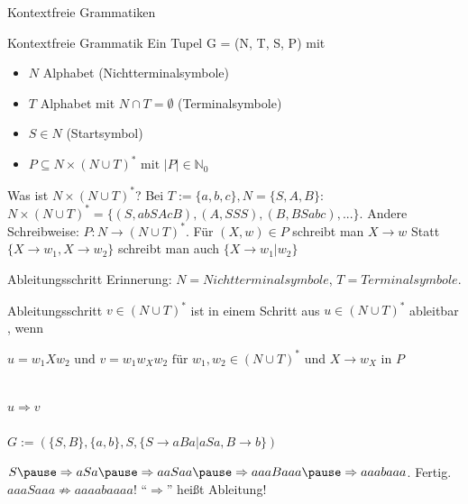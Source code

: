 \documentclass[]{beamer}
\begin{document}
\begin{frame}{Kontextfreie Grammatiken}
	\begin{block}{Kontextfreie Grammatik}
		Ein Tupel G = (N, T, S, P) mit
		\begin{itemize}
			\item $N$ Alphabet (Nichtterminalsymbole)
			\item $T$ Alphabet mit $N \cap T = \emptyset$ (Terminalsymbole)
			\item $S \in N$ (Startsymbol)
			\item $P \subseteq N \times (N \cup T)^* \text{ mit } |P| \in \mathbb{N}_0$
		\end{itemize}
	\end{block}

	\begin{itemize}
		\pitem Was ist $N \times (N \cup T)^*$? Bei $T := \{a,b,c\}, N = \{S, A, B\}$\ip : $N \times (N \cup T)^* = \{(S, abSAcB), (A, SSS), (B, BSabc), ...\}$.
		\pitem Andere Schreibweise: $P : N \rightarrow (N \cup T)^*$.
		\pitem Für $(X, w) \in P$ schreibt man $X \rightarrow w$
		\pitem Statt $\{X\rightarrow w_1, X \rightarrow w_2 \}$ schreibt man auch $\{X \rightarrow w_1 | w_2\}$
	\end{itemize}
	
\end{frame}

\begin{frame}{Ableitungsschritt}
	Erinnerung: $N = Nichtterminalsymbole$, $T = Terminalsymbole$. \pause
	
	\begin{block}{Ableitungsschritt}
		$v \in (N \cup T)^*$ ist in einem Schritt aus $u \in (N \cup T)^*$ ableitbar , wenn 
		\begin{itemize}
			\pitem $u = w_1 X w_2 \text{ und } v = w_1 w_X w_2 \text{ für } w_1, w_2 \in (N \cup T)^* $
			\pitem und $X \rightarrow w_X$ in $P$
		\end{itemize}
	\end{block}

	\bp{}\\
	$u\Rightarrow v$\\
	\bp{}\\
	$G:= (\{S,B\}, \{a,b\}, S, \{S \rightarrow aBa|aSa, B \rightarrow b\})$
	
	\begin{itemize}
		\pitem $S \ip\Rightarrow aSa \ip\Rightarrow aaSaa \ip\Rightarrow aaaBaaa \ip\Rightarrow aaabaaa$. \ip Fertig.
		\pitem $aaaSaaa \not\Rightarrow aaaabaaaa$! 
		\pitem ``$\Rightarrow$'' heißt  Ableitung!
	\end{itemize}
\end{frame}
\end{document}
